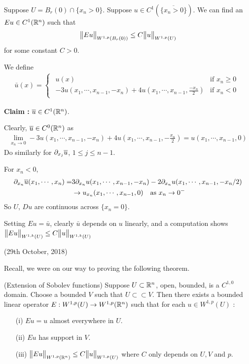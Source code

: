 \documentclass[12pt,a4paper]{report}
\newenvironment{proof}
{\begin{changemargin}{1cm}{0.5cm} 
	}%
	{\end{changemargin}
}
\newenvironment{subproof}
{\begin{changemargin}{0.5cm}{0.5cm} 
	}%
	{\end{changemargin}
}
\begin{document}
\lem Suppose $U = B_r(0) \cap \{x_n >0 \}$.  Suppose $u \in C^1( \overline{\{x_n>0 \}})$. We can find an $Eu \in C^1(\mathbb{R}^n)$ such that
\begin{align*}
\bigl\lVert Eu\bigr\rVert_{W^{1,p}(B_r(0))} \leq C \bigl\lVert u\bigr\rVert_{W^{1,p}(U)}
\end{align*}
for some constant $C>0$.
\begin{proof}
\pf We define \begin{align*}
\bar{u}(x) = \begin{cases}
\begin{array}{lc}
u(x) & \text{if } x_n \geq 0 \\
-3u(x_1, \cdots, x_{n-1},-x_n) + 4u(x_1,\cdots, x_{n-1},\frac{-x_n}{2}) & \text{if } x_n<0
\end{array}
\end{cases}
\end{align*}
\begin{subproof}
\textbf{Claim :} $\overline{u} \in C^1(\mathbb{R}^n)$.

\quad Clearly, $\overline{u} \in C^0(\mathbb{R}^n)$ as
\begin{align*}
\lim_{x_n \rightarrow 0} -3u(x_1, \cdots,x_{n-1},-x_n) + 4u(x_1, \cdots, x_{n-1},-\frac{x_n}{2}) = u(x_1, \cdots, x_{n-1},0)
\end{align*}
Do similarly for $\partial_{x_j} \overline{u}$, $1\leq j\leq n-1$.

\quad For $x_n <0$,
\begin{align*}
\partial_{x_n} \overline{u}(x_1,\cdots, x_n) =& 3\partial_{x_n} u(x_1, \cdots, x_{n-1},-x_n) -2\partial_{x_n} u(x_1, \cdots, x_{n-1},-x_n/2)\\
& \rightarrow u_{x_n}(x_1, \cdots, x_{n-1},0) \quad \text{as } x_n \rightarrow 0^-
\end{align*}
So $U$, $Du$ are continuous across $\{x_n=0\}$. 
\end{subproof}
Setting $Eu = \bar{u}$, clearly $\bar{u}$ depends on $u$ linearly, and a computation shows $\bigl\lVert Eu\bigr\rVert_{W^{1,k}(U)} \leq C \bigl\lVert u\bigr\rVert_{W^{1,k}(U)}$

\eop
\end{proof}
\s

\newday

(29th October, 2018)
\s

Recall, we were on our way to proving the following theorem.
\s

\thm (Extension of Sobolev functions) Suppose $U\subset \mathbb{R}^n$, open, bounded, is a $C^{1,0}$ domain. Choose a bounded $V$ such that $U \subset\subset V$. Then there exists a bounded linear operator $E : W^{1,p}(U) \rightarrow W^{1,p}(\mathbb{R}^n)$ such that for each $u \in W^{1,p}(U)$ :
\begin{itemize}
\item[(i)] $Eu =u$ almost everywhere in $U$.
\item[(ii)] $Eu$ has support in $V$.
\item[(iii)] $\bigl\lVert Eu\bigr\rVert_{W^{1,p}(\mathbb{R}^n)} \leq C \bigl\lVert u\bigr\rVert_{W^{1,p}(U)}$ where $C$ only depends on $U,V$ and $p$.
\end{itemize}
\s
\end{document}
